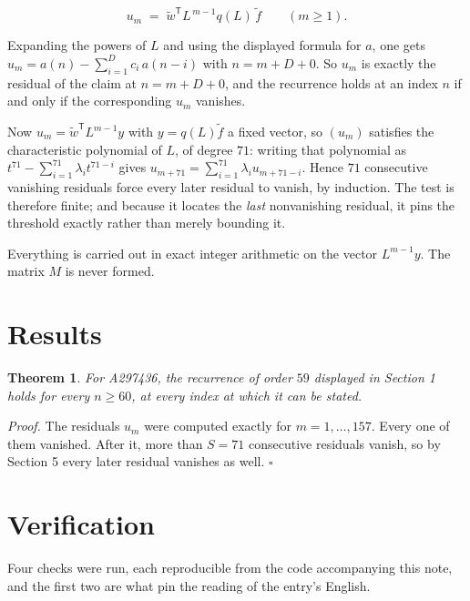 \documentclass[11pt]{article}
\newtheorem{theorem}{Theorem}
\theoremstyle{definition}
\begin{document}
\[u_m \;=\; \tilde w^{\mathsf T} L^{\,m-1} q(L)\,\tilde f \qquad (m \ge 1).\]

Expanding the powers of $L$ and using the displayed formula for $a$, one gets $u_m = a(n) - \sum_{i=1}^{D} c_i\,a(n-i)$ with $n = m + D + 0$. So $u_m$ is exactly the residual of the claim at $n = m + D + 0$, and the recurrence holds at an index $n$ if and only if the corresponding $u_m$ vanishes.

Now $u_m = \tilde w^{\mathsf T} L^{m-1} y$ with $y = q(L)\tilde f$ a fixed vector, so $(u_m)$ satisfies the characteristic polynomial of $L$, of degree $71$: writing that polynomial as $t^{71} - \sum_{i=1}^{71} \lambda_i t^{71-i}$ gives $u_{m+71} = \sum_{i=1}^{71} \lambda_i u_{m+71-i}$. Hence $71$ consecutive vanishing residuals force every later residual to vanish, by induction. The test is therefore finite; and because it locates the {\itshape last} nonvanishing residual, it pins the threshold exactly rather than merely bounding it.

Everything is carried out in exact integer arithmetic on the vector $L^{m-1}y$. The matrix $M$ is never formed.

\section{Results}

\begin{theorem} For A297436, the recurrence of order $59$ displayed in Section 1 holds for every $n \ge 60$, at every index at which it can be stated.\end{theorem}

{\itshape Proof.} The residuals $u_m$ were computed exactly for $m = 1,\dots,157$. Every one of them vanished. After it, more than $S = 71$ consecutive residuals vanish, so by Section 5 every later residual vanishes as well. $\square$

\section{Verification}

Four checks were run, each reproducible from the code accompanying this note, and the first two are what pin the reading of the entry's English.
\end{document}
